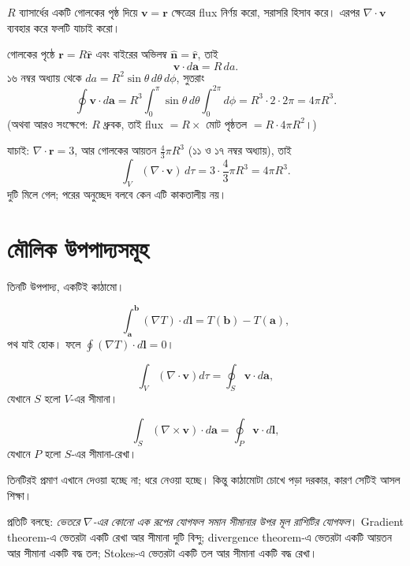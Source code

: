 \documentclass[11pt]{article}
\begin{document}
 $R$ ব্যাসার্ধের একটি গোলকের পৃষ্ঠ দিয়ে
$\mathbf{v} = \mathbf{r}$ ক্ষেত্রের flux নির্ণয় করো, সরাসরি হিসাব করে।
এরপর $\nabla\cdot\mathbf{v}$ ব্যবহার করে ফলটি যাচাই করো।

\begin{sol}
গোলকের পৃষ্ঠে $\mathbf{r} = R\hat{\mathbf{r}}$ এবং বাইরের অভিলম্ব
$\hat{\mathbf{n}} = \hat{\mathbf{r}}$, তাই
\[
  \mathbf{v}\cdot d\mathbf{a} = R\,da .
\]
১৬ নম্বর অধ্যায় থেকে $da = R^{2}\sin\theta\,d\theta\,d\phi$, সুতরাং
\[
  \oint\mathbf{v}\cdot d\mathbf{a}
  = R^{3}\int_{0}^{\pi}\sin\theta\,d\theta\int_{0}^{2\pi}d\phi
  = R^{3}\cdot 2 \cdot 2\pi = 4\pi R^{3} .
\]
(অথবা আরও সংক্ষেপে: $R$ ধ্রুবক, তাই flux $= R \times$ মোট পৃষ্ঠতল
$= R\cdot 4\pi R^{2}$।)

যাচাই: $\nabla\cdot\mathbf{r} = 3$, আর গোলকের আয়তন $\tfrac{4}{3}\pi R^{3}$
(১১ ও ১৭ নম্বর অধ্যায়), তাই
\[
  \int_{V}(\nabla\cdot\mathbf{v})\,d\tau = 3 \cdot \frac{4}{3}\pi R^{3}
  = 4\pi R^{3} .
\]
দুটি মিলে গেল; পরের অনুচ্ছেদ বলবে কেন এটি কাকতালীয় নয়।
\end{sol}

\section{মৌলিক উপপাদ্যসমূহ}

তিনটি উপপাদ্য, একটিই কাঠামো।

\begin{idea}
\[
  \int_{\mathbf{a}}^{\mathbf{b}} \left( \nabla T \right)\cdot d\mathbf{l}
  = T(\mathbf{b}) - T(\mathbf{a}) ,
\]
পথ যাই হোক। ফলে $\oint\left( \nabla T \right)\cdot d\mathbf{l} = 0$।
\end{idea}

\begin{idea}
\[
  \int_{V}\left( \nabla\cdot\mathbf{v} \right)d\tau
  = \oint_{S}\mathbf{v}\cdot d\mathbf{a} ,
\]
যেখানে $S$ হলো $V$-এর সীমানা।
\end{idea}

\begin{idea}
\[
  \int_{S}\left( \nabla\times\mathbf{v} \right)\cdot d\mathbf{a}
  = \oint_{P}\mathbf{v}\cdot d\mathbf{l} ,
\]
যেখানে $P$ হলো $S$-এর সীমানা-রেখা।
\end{idea}

তিনটিরই প্রমাণ এখানে দেওয়া হচ্ছে না; ধরে নেওয়া হচ্ছে। কিন্তু কাঠামোটা
চোখে পড়া দরকার, কারণ সেটিই আসল শিক্ষা।

প্রতিটি বলছে: \emph{ভেতরে $\nabla$-এর কোনো এক রূপের যোগফল সমান সীমানার উপর
মূল রাশিটির যোগফল}। Gradient theorem-এ ভেতরটা একটি রেখা আর সীমানা দুটি
বিন্দু; divergence theorem-এ ভেতরটা একটি আয়তন আর সীমানা একটি বদ্ধ তল;
Stokes-এ ভেতরটা একটি তল আর সীমানা একটি বদ্ধ রেখা।
\end{document}
